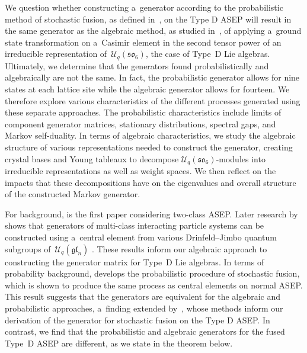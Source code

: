 \documentclass[pdftex]{sigma}
\numberwithin{equation}{section}
\theoremstyle{definition}
\begin{document}
We question whether constructing a~generator according to the probabilistic method of stochastic fusion, as defined in~\cite{kuan2019stochastic}, on the Type D ASEP will result in the same generator as the algebraic method, as studied in~\cite{Carinci2016,Carinci2014,CrampeRagoucyVanicatReview2014,Kuan_2016,Kuan_2018,Kuan_2017,KuanTwoDualities2021}, of applying a~ground state transformation on a~Casimir element in the second tensor power of an irreducible representation of~$\mathcal{U}_q(\mathfrak{so}_6)$, the case of Type~D Lie algebras. Ultimately, we determine that the generators found probabilistically and algebraically are not the same. In fact, the probabilistic generator allows for nine states at each lattice site while the algebraic generator allows for fourteen. We therefore explore various characteristics of the different processes generated using these separate approaches. The probabilistic characteristics include limits of component generator matrices, stationary distributions, spectral gaps, and Markov self-duality. In terms of algebraic characteristics, we study the algebraic structure of various representations needed to construct the generator, creating crystal bases and Young tableaux to decompose $\mathcal{U}_q(\mathfrak{so}_6)$-modules into irreducible representations as well as weight spaces. We then reflect on the impacts that these decompositions have on the eigenvalues and overall structure of the constructed Markov generator.

For background, \cite{10.1214/aop/1176996084} is the first paper considering two-class ASEP. Later research by~\cite{Belitsky_2015,belitskyschutz15,belitsky2016selfdualityshockdynamicsncomponent,Carinci2016,Carinci2014,Kuan_2016, Kuan_2018, Kuan_2017, kuan2020interactingparticlesystemstype, rohr2023type} shows that generators of multi-class interacting particle systems can be constructed using a~central element from various Drinfeld--Jimbo quantum subgroups of~$\mathcal{U}_q(\mathfrak{gl}_n)$ \cite{Drinfeld85, Jimbo85}. These results inform our algebraic approach to constructing the generator matrix for Type~D Lie algebras. In terms of probability background, \cite{kuan2019stochastic} develops the probabilistic procedure of stochastic fusion, which is shown to produce the same process as central elements on normal ASEP. This result suggests that the generators are equivalent for the algebraic and probabilistic approaches, a~finding extended by~\cite{rohr2023type}, whose methods inform our derivation of the generator for stochastic fusion on the Type D ASEP. In contrast, we find that the probabilistic and algebraic generators for the fused Type~D ASEP are different, as we state in the theorem below.
\end{document}

